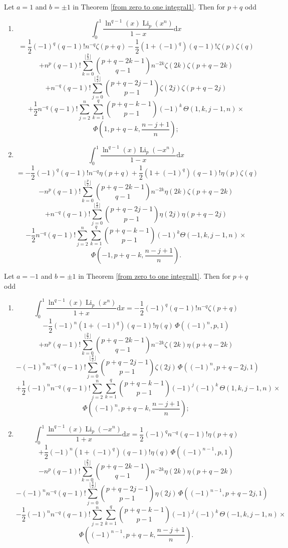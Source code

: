 \documentclass[11pt,reqno]{article}
\begin{document}
\begin{corollary} Let $a=1$ and $b=\pm1$ in Theorem \ref{from zero to one integral1}. Then for $p+q$ odd
	\begin{enumerate}
		\item[i)]
		\[\int_0^1\frac{\ln^{q-1}(x)\operatorname{Li}_{p}(x^{n})}{1-x}\mathrm{d} x\]
		\[=\frac12 {(-1)}^{q}(q-1)!n^{-q}\zeta(p+q)-\frac12(1+{(-1)}^{q})(q-1)!\zeta(p)\zeta(q)\]
		\[+n^{p}(q-1)!\sum_{k=0}^{\lfloor\frac{p}{2}\rfloor}\binom{p+q-2k-1}{q-1}n^{-2k}\zeta(2k)\zeta(p+q-2k)\]
		\[+n^{-q}(q-1)!\sum_{j=0}^{\lfloor\frac{q}{2}\rfloor}\binom{p+q-2j-1}{p-1}\zeta(2j)\zeta(p+q-2j)\]
		\[+\frac12 n^{-q}(q-1)!\sum_{j=2}^{n}\sum_{k=1}^{q}\binom{p+q-k-1}{p-1}{(-1)}^{k}\,\Theta(1,k,j-1,n)\times\]
		\[\Phi\left(1,p+q-k,\frac{n-j+1}{n}\right);\]
		\item[ii)]
		\[\int_0^1\frac{\ln^{q-1}(x)\operatorname{Li}_{p}(-x^{n})}{1-x}\mathrm{d} x\]
		\[=-\frac12 {(-1)}^{q}(q-1)!n^{-q}\eta(p+q)+\frac12(1+{(-1)}^{q})(q-1)!\eta(p)\zeta(q)\]
		\[-n^{p}(q-1)!\sum_{k=0}^{\lfloor\frac{p}{2}\rfloor}\binom{p+q-2k-1}{q-1}n^{-2k}\eta(2k)\zeta(p+q-2k)\]
		\[+n^{-q}(q-1)!\sum_{j=0}^{\lfloor\frac{q}{2}\rfloor}\binom{p+q-2j-1}{p-1}\eta(2j)\eta(p+q-2j)\]
		\[-\frac12 n^{-q}(q-1)!\sum_{j=2}^{n}\sum_{k=1}^{q}\binom{p+q-k-1}{p-1}{(-1)}^{k}\Theta(-1,k,j-1,n)\times\]
		\[\Phi\left(-1,p+q-k,\frac{n-j+1}{n}\right).\]
	\end{enumerate}
\end{corollary}

\begin{corollary}
	Let $a=-1$ and $b=\pm1$ in Theorem \ref{from zero to one integral1}. Then for $p+q$ odd
	\begin{enumerate}
		\item[i)]
		\[\int_0^1\frac{\ln^{q-1}(x)\operatorname{Li}_{p}(x^{n})}{1+x}\mathrm{d} x=-\frac12{(-1)}^{q}(q-1)!n^{-q}\zeta(p+q)\]
		\[-\frac12{(-1)}^{n}(1+{(-1)}^{q})(q-1)!\eta(q)\,\Phi({(-1)}^{n},p,1)\]
		\[+n^{p}(q-1)!\sum_{k=0}^{\lfloor\frac{p}{2}\rfloor}\binom{p+q-2k-1}{q-1}n^{-2k}\zeta(2k)\eta(p+q-2k)\]
		\[-{(-1)}^{n}n^{-q} (q-1)!\sum_{j=0}^{\lfloor\frac{q}{2}\rfloor}\binom{p+q-2j-1}{p-1}\zeta(2j)\,\Phi({(-1)}^{n},p+q-2j,1)\]
		\[+\frac12{(-1)}^{n}n^{-q}(q-1)!\sum_{j=2}^{n}\sum_{k=1}^{q}\binom{p+q-k-1}{p-1}{(-1)}^{j}{(-1)}^{k}\,\Theta(1,k,j-1,n)\times\]
		\[\Phi\left({(-1)}^{n},p+q-k,\frac{n-j+1}{n}\right);\]
		\item[ii)]
		\[\int_0^1\frac{\ln^{q-1}(x)\operatorname{Li}_{p}(-x^{n})}{1+x}\mathrm{d} x=\frac12 {(-1)}^{q}n^{-q}(q-1)!\eta(p+q)\]
		\[+\frac12{(-1)}^{n}(1+{(-1)}^{q})(q-1)!\eta(q)\,\Phi({(-1)}^{n-1},p,1)\]
		\[-n^{p}(q-1)!\sum_{k=0}^{\lfloor\frac{p}{2}\rfloor}\binom{p+q-2k-1}{q-1}n^{-2k}\eta(2k)\eta(p+q-2k)\]
		\[-{(-1)}^{n}n^{-q} (q-1)!\sum_{j=0}^{\lfloor\frac{q}{2}\rfloor}\binom{p+q-2j-1}{p-1}\eta(2j)\,\Phi({(-1)}^{n-1},p+q-2j,1)\]
		\[-\frac12{(-1)}^{n}n^{-q}(q-1)!\sum_{j=2}^{n}\sum_{k=1}^{q}\binom{p+q-k-1}{p-1}{(-1)}^{j}{(-1)}^{k}\,\Theta(-1,k,j-1,n)\times\]
		\[\Phi\left({(-1)}^{n-1},p+q-k,\frac{n-j+1}{n}\right).\]
	\end{enumerate}
\end{corollary}
\end{document}
